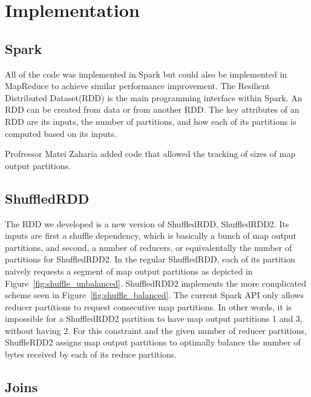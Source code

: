 \chapter{Implementation}\label{intro-ch}

\section{Spark}

All of the code was implemented in Spark but could also be implemented in MapReduce to achieve similar performance improvement.
The Resilient Distributed Dataset(RDD) is the main programming interface within Spark.
An RDD can be created from data or from another RDD. The key attributes of an RDD are its inputs,
the number of partitions, and how each of its partitions is computed based on its inputs.

Profressor Matei Zaharia added code that allowed the tracking of sizes of map output partitions.   

\section{ShuffledRDD}

The RDD we developed is a new version of ShuffledRDD, ShuffledRDD2. 
Its inputs are first a shuffle dependency, which is basically a bunch of map output partitions, and second, a number of reducers, or equivalentally the 
number of partitions for ShuffledRDD2. 
In the regular ShuffledRDD, each of its partition naively requests a segment of map output partitions as depicted in Figure~\ref{fig:shuffle_unbalanced}.
ShuffledRDD2 implements the more complicated scheme seen in Figure~\ref{fig:shuffle_balanced}. 
The current Spark API only allows reducer partitions to request consecutive map partitions. In other words, it is impossible for a ShuffledRDD2 partition to have map output partitions 1 and 3, without having 2. For this constraint and the given number of reducer partitions, ShuffleRDD2 assigns map output partitions to optimally balance the number of bytes received by each of its reduce partitions. 

\section{Joins}

